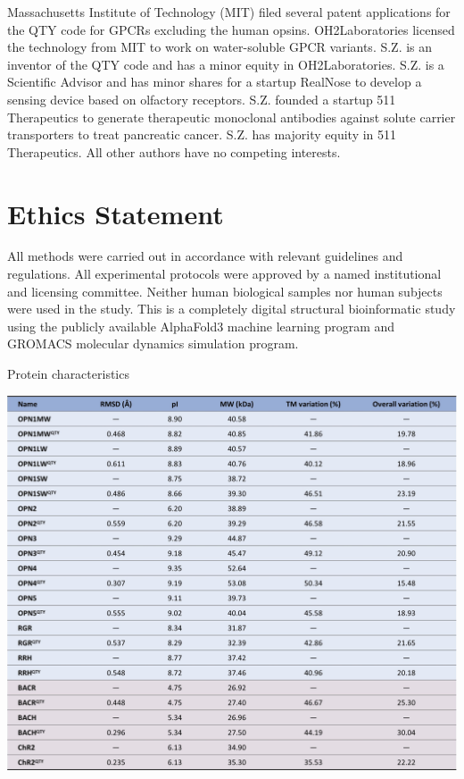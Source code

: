 \documentclass[fleqn,10pt]{manuscript}
\begin{document}
Massachusetts Institute of Technology (MIT) filed several patent applications for the QTY code for GPCRs excluding the human opsins. OH2Laboratories licensed the technology from MIT to work on water-soluble GPCR variants. S.Z. is an inventor of the QTY code and has a minor equity in OH2Laboratories. S.Z. is a Scientific Advisor and has minor shares for a startup RealNose to develop a sensing device based on olfactory receptors. S.Z. founded a startup 511 Therapeutics to generate therapeutic monoclonal antibodies against solute carrier transporters to treat pancreatic cancer. S.Z. has majority equity in 511 Therapeutics. All other authors have no competing interests.


\section*{Ethics Statement}

All methods were carried out in accordance with relevant guidelines and regulations. All experimental protocols were approved by a named institutional and licensing committee. Neither human biological samples nor human subjects were used in the study. This is a completely digital structural bioinformatic study using the publicly available AlphaFold3 machine learning program and GROMACS molecular dynamics simulation program.




\begin{table}[htbp]
	\centering
	\caption{Protein characteristics}
	\label{tb:characteristics}
	\includegraphics[width=\linewidth]{Figures/characteristics.jpg}
\end{table}
\end{document}
